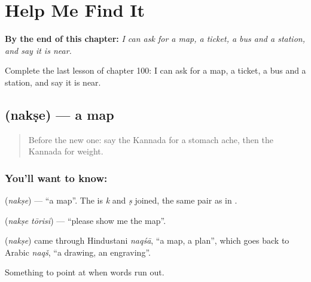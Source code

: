 
\chapter{Help Me Find It}
\label{ch:ka-help-me-find-it}

\begin{chapteropening}
\textbf{By the end of this chapter:} \emph{I can ask for a map, a ticket, a bus and a station, and say it is near.}

Complete the last lesson of chapter 100: I can ask for a map, a ticket, a bus and a station, and say it is near.
\end{chapteropening}

\section[\texorpdfstring{\kn{ನಕ್ಷೆ} (nakṣe)}{ನಕ್ಷೆ (nakṣe)}]{ (nakṣe) — a map}

\label{lesson:KA-C100-map}



\begin{quote}
Before the new one: say the Kannada for a stomach ache, then the Kannada for weight.
\end{quote}

\subsection*{You'll want to know: }
\textbf{} (\emph{nakṣe}) — \textquotedblleft{}a map\textquotedblright{}. The \textbf{} is \emph{k} and \emph{ṣ} joined, the same pair as in \textbf{}.

\textbf{ } (\emph{nakṣe tōrisi}) — \textquotedblleft{}please show me the map\textquotedblright{}.

\begin{cousinweb}
\textbf{} (\emph{nakṣe}) came through Hindustani \emph{naqśā}, \textquotedblleft{}a map, a plan\textquotedblright{}, which goes back to Arabic \emph{naqš}, \textquotedblleft{}a drawing, an engraving\textquotedblright{}.
\end{cousinweb}

\begin{grammarlens}[title={What you've built}]
Something to point at when words run out.
\end{grammarlens}

